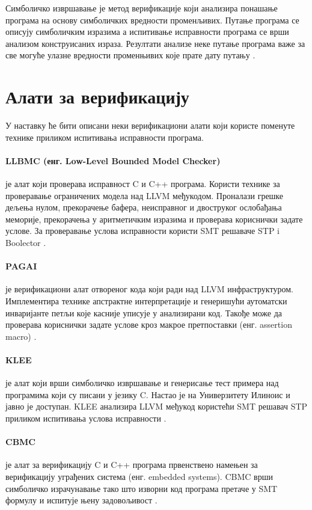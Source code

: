 \documentclass[12pt,oneside]{memoir}
\begin{document}
Симболичко извршавање је метод верификације који анализира понашање програма на основу симболичких вредности променљивих. Путање програма се описују симболичким изразима а испитивање исправности програма се врши анализом конструисаних израза. Резултати анализе неке путање програма важе за све могуће улазне вредности променњивих које прате дату путању \cite{symbolic_exec}.

  \section{Алати за верификацију}
У наставку ће бити описани неки верификациони алати који користе поменуте технике приликом испитивања исправности програма. 

\paragraph{ LLBMC (енг. Low-Level Bounded Model Checker)} је алат који проверава исправност 
C и C++ програма. Користи технике за проверавање ограничених модела над LLVM међукодом. Проналази грешке дељења нулом, прекорачење бафера, неисправног и двоструког ослобађања меморије, прекорачења у аритметичким изразима и проверава кориснички задате услове. За проверавање услова исправности користи SMT решаваче STP i Boolector \cite{llbmc}.

\paragraph{PAGAI} је верификациони алат отвореног кода који ради над LLVM инфраструктуром. Имплементира технике апстрактне интерпретације и  генеришући аутоматски инваријанте петљи које касније уписује у анализирани код.  Такође може да проверава кориснички задате услове кроз макрое претпоставки (енг. assertion macro) \cite{pagai}.

\paragraph{KLEE} је алат који врши симболичко извршавање и генерисање тест примера над програмима који су писани у језику C. Настао је на Универзитету Илиноис и јавно је доступан. KLEE анализира LLVM међукод користећи SMT решавач STP приликом испитивања услова исправности \cite{klee}. 

\paragraph{CBMC} је алат за верификацију C и C++ програма првенствено намењен за верификацију уграђених система (енг. embedded systems). CBMC врши симболичко израчунавање тако што изворни код програма претаче у SMT формулу и испитује њену задовољивост \cite{cbmc}. 
\end{document}
